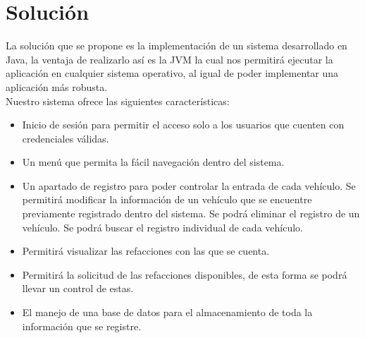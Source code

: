 \section{Solución}
La solución que se propone es la implementación de un sistema desarrollado en Java, la ventaja de realizarlo así es la JVM la cual nos permitirá ejecutar la aplicación en cualquier sistema operativo, al igual de poder implementar una aplicación más robusta. 
\\
Nuestro sistema ofrece las siguientes características:
\begin{itemize}
	\item Inicio de sesión para permitir el acceso solo a los usuarios que cuenten con credenciales válidas. 
	\item Un menú que permita la fácil navegación dentro del sistema.
	\item Un apartado de registro para poder controlar la entrada de cada vehículo.
	\subitem Se permitirá modificar la información de un vehículo que se encuentre previamente registrado dentro del sistema.
	\subitem Se podrá eliminar el registro de un vehículo.
	\subitem Se podrá buscar el registro individual de cada vehículo.
	\item Permitirá visualizar las refacciones con las que se cuenta.
	\item Permitirá la solicitud de las refacciones disponibles, de esta forma se podrá llevar un control de estas.
	\item El manejo de una base de datos para el almacenamiento de toda la información que se registre.
\end{itemize}
\clearpage